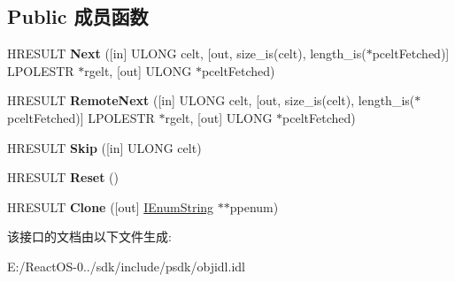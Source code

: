 \subsection*{Public 成员函数}
\begin{DoxyCompactItemize}
\item 
\mbox{\label{interface_i_enum_string_a01de5675f48acf3171e70a46bb02b2dd}} 
H\+R\+E\+S\+U\+LT {\bfseries Next} (\mbox{[}in\mbox{]} U\+L\+O\+NG celt, \mbox{[}out, size\+\_\+is(celt), length\+\_\+is($\ast$pcelt\+Fetched)\mbox{]} L\+P\+O\+L\+E\+S\+TR $\ast$rgelt, \mbox{[}out\mbox{]} U\+L\+O\+NG $\ast$pcelt\+Fetched)
\item 
\mbox{\label{interface_i_enum_string_a53133de0809f10059ebcbd10313d7542}} 
H\+R\+E\+S\+U\+LT {\bfseries Remote\+Next} (\mbox{[}in\mbox{]} U\+L\+O\+NG celt, \mbox{[}out, size\+\_\+is(celt), length\+\_\+is($\ast$pcelt\+Fetched)\mbox{]} L\+P\+O\+L\+E\+S\+TR $\ast$rgelt, \mbox{[}out\mbox{]} U\+L\+O\+NG $\ast$pcelt\+Fetched)
\item 
\mbox{\label{interface_i_enum_string_affb73742bf7603294531a77917c29a6d}} 
H\+R\+E\+S\+U\+LT {\bfseries Skip} (\mbox{[}in\mbox{]} U\+L\+O\+NG celt)
\item 
\mbox{\label{interface_i_enum_string_a93f4c559198074e390d2d42ae8ad3c61}} 
H\+R\+E\+S\+U\+LT {\bfseries Reset} ()
\item 
\mbox{\label{interface_i_enum_string_aba6ccf3464fdb0b6f6800aded4223cab}} 
H\+R\+E\+S\+U\+LT {\bfseries Clone} (\mbox{[}out\mbox{]} \hyperlink{interface_i_enum_string}{I\+Enum\+String} $\ast$$\ast$ppenum)
\end{DoxyCompactItemize}


该接口的文档由以下文件生成\+:\begin{DoxyCompactItemize}
\item 
E\+:/\+React\+O\+S-\/0../sdk/include/psdk/objidl.\+idl\end{DoxyCompactItemize}

